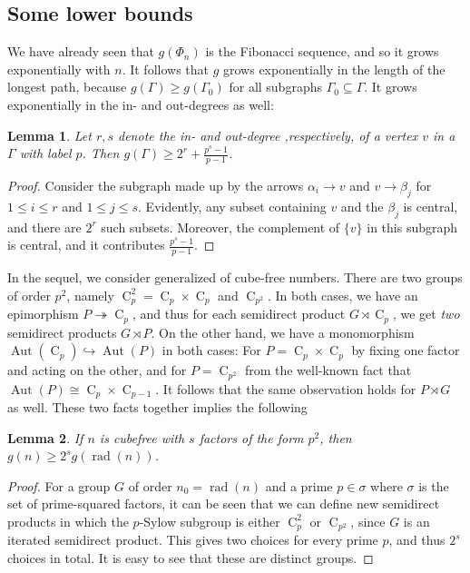 \documentclass{article}
\newcommand{\aut}[1]{\operatorname{Aut}(#1)}
\newcommand{\cyc}[1]{\operatorname{C}_{#1}}
\theoremstyle{plain}
\newtheorem{lem}{Lemma}[section]
\theoremstyle{definition}
\begin{document}
\subsection{Some lower bounds}
We have already seen that $g(\Phi_n)$ is the Fibonacci sequence, and so it grows exponentially with $n$. It follows that $g$ grows exponentially in the length of the longest path, because $g(\Gamma) \ge  g(\Gamma_0)$ for all subgraphs $\Gamma_0 \subseteq \Gamma$. It grows exponentially in the in- and out-degrees as well:
\begin{lem}
	Let $r, s$ denote the in- and out-degree ,respectively, of a vertex $v$ in a  $\Gamma$ with label $p$. Then $g(\Gamma) \ge 2^r + \frac{p^s - 1}{p - 1}$.
\end{lem}
\begin{proof}
	Consider the subgraph made up by the arrows $\alpha_i \rightarrow v$ and $v \rightarrow \beta_j$ for $1 \le i \le r$ and $1 \le j \le s$. Evidently, any subset containing $v$ and the $\beta_j$ is central, and there are $2^r$ such subsets. Moreover, the complement of $\{v\}$ in this subgraph is central, and it contributes \nolinebreak[4] $\frac{p^s - 1}{p - 1}$.
\end{proof}
In the sequel, we consider generalized  of cube-free numbers. There are two groups of order $p^2$, namely $\cyc{p}^2 = \cyc{p} \times \cyc{p}$ and $\cyc{p^2}$. In both cases, we have an epimorphism $P \twoheadrightarrow \cyc{p}$, and thus for each semidirect product $G \rtimes \cyc{p}$, we get \textit{two} semidirect products $G \rtimes P$. On the other hand, we have a monomorphism $\aut{\cyc{p}} \hookrightarrow \aut{P}$ in both cases: For $P = \cyc{p} \times \cyc{p}$ by fixing one factor and acting on the other, and for $P = \cyc{p^2}$ from the well-known fact that $\aut{P} \cong \cyc{p} \times \cyc{p - 1}$. It follows that the same observation holds for $P \rtimes G$ as well. These two facts together implies the following

\begin{lem}
	If $n$ is cubefree with $s$ factors of the form $p^2$, then $g(n) \ge 2^s g(\operatorname{rad}(n))$.
\end{lem}
\begin{proof}
	For a group $G$ of order $n_0 = \operatorname{rad}(n)$ and a prime $p \in \sigma$ where $\sigma$ is the set of prime-squared factors, it can be seen that we can define new semidirect products in which the $p$-Sylow subgroup is either $\cyc{p}^2$ or $\cyc{p^2}$, since $G$ is an iterated semidirect product. This gives two choices for every prime $p$, and thus $2^s$ choices in total. It is easy to see that these are distinct groups.
\end{proof}
\end{document}
